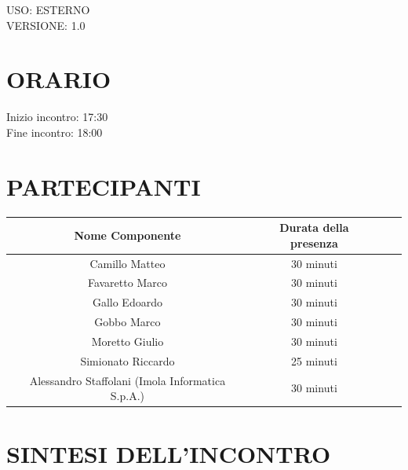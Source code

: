 \documentclass[5pt]{article}
\begin{document}
\begin{flushright}
    \begin{spacing}{1}
        USO: ESTERNO\\
        VERSIONE: 1.0\\
    \end{spacing}
\end{flushright}


\restoregeometry

\pagebreak






\section{\Large ORARIO}
\begin{spacing}{1.5}
    {\large Inizio incontro: 17:30}\\
    {\large Fine incontro: 18:00}
\end{spacing}

\section{PARTECIPANTI}
\setlength\cellspacetoplimit{6pt}
\setlength\cellspacebottomlimit{6pt}

\begin{table}[ht]
  \begin{tabular}{|Sc|Sc|}
    \hline
    \textbf{Nome Componente} & \textbf{Durata della presenza} \\
    \hline
    Camillo Matteo & 30 minuti \\
    Favaretto Marco & 30 minuti \\
    Gallo Edoardo & 30 minuti \\
    Gobbo Marco & 30 minuti \\
    Moretto Giulio & 30 minuti \\
    Simionato Riccardo & 25 minuti \\
    Alessandro Staffolani (Imola Informatica S.p.A.) & 30 minuti\\
    \hline
  \end{tabular}
  \label{tab:conference}
\end{table}

\section{SINTESI DELL'INCONTRO}
\end{document}
